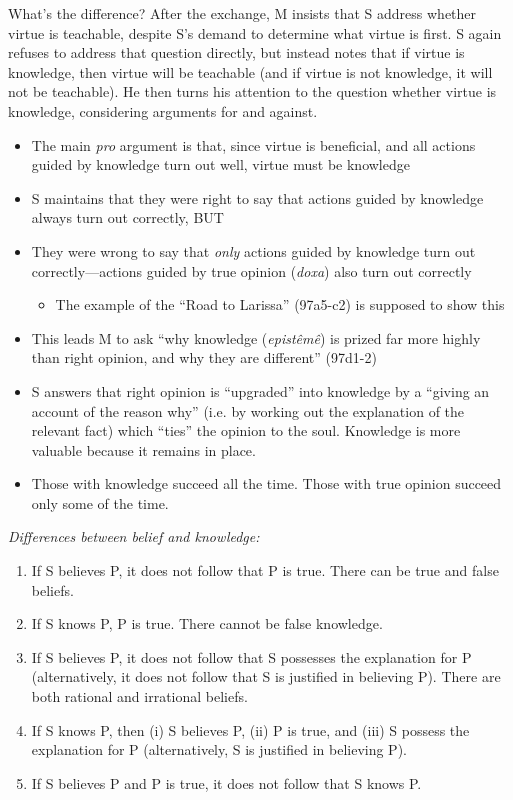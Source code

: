 \documentclass[10 pt]{article}
\begin{document}
What's the difference? After the exchange, M insists that S address whether virtue is teachable, despite S's demand to determine what virtue is first. S again refuses to address that question directly, but instead notes that if virtue is knowledge, then virtue will be teachable (and if virtue is not knowledge, it will not be teachable). He then turns his attention to the question whether virtue is knowledge, considering arguments for and against.
\begin{itemize}\item{The main \emph{pro} argument is that, since virtue is beneficial, and all actions guided by knowledge turn out well, virtue must be knowledge}
\item S maintains that they were right to say that actions guided by knowledge always turn out correctly, BUT
\item They were wrong to say that \emph{only} actions guided by knowledge turn out correctly---actions guided by true opinion (\emph{doxa}) also turn out correctly

\begin{itemize}\item{The example of the ``Road to Larissa'' (97a5-c2) is supposed to show this}\end{itemize}

\item This leads M to ask ``why knowledge (\emph{epist\^{e}m\^{e}}) is prized far more highly than right opinion, and why they are different'' (97d1-2)

\item S answers that right opinion is ``upgraded'' into knowledge by a ``giving an account of the reason why'' (i.e. by working out the explanation of the relevant fact) which ``ties'' the opinion to the soul. Knowledge is more valuable because it remains in place.
\item Those with knowledge succeed all the time. Those with true opinion succeed only some of the time.

\end{itemize}

\noindent \emph{Differences between belief and knowledge:} 

\begin{enumerate}
\item If S believes P, it does not follow that P is true. There can be true and false beliefs. 
\item If S knows P, P is true. There cannot be false knowledge.
\item If S believes P, it does not follow that S possesses the explanation for P (alternatively, it does not follow that S is justified in believing P). There are both rational and irrational beliefs.
\item If S knows P, then (i) S believes P, (ii) P is true, and (iii) S possess the explanation for P (alternatively, S is justified in believing P). 
\item If S believes P and P is true, it does not follow that S knows P.  
\end{enumerate}
\end{document}
